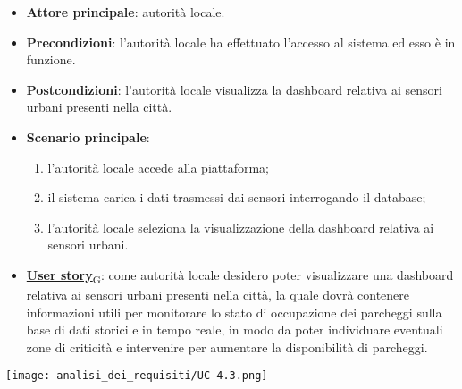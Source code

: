 \begin{itemize}
	\item \textbf{Attore principale}: autorità locale.
	\item \textbf{Precondizioni}: l'autorità locale ha effettuato l'accesso al sistema ed esso è in funzione.
	\item \textbf{Postcondizioni}: l'autorità locale visualizza la dashboard relativa
	      ai sensori urbani presenti nella città.
	\item \textbf{Scenario principale}:
	      \begin{enumerate}
		      \item l'autorità locale accede alla piattaforma;
		      \item il sistema carica i dati trasmessi dai sensori interrogando il database;
		      \item l'autorità locale seleziona la visualizzazione della dashboard relativa ai sensori urbani.
	      \end{enumerate}
	\item \href{https://7last.github.io/docs/pb/documentazione-interna/glossario\#user-story}{\textbf{User story}\textsubscript{G}}:
	      come autorità locale desidero poter visualizzare una dashboard relativa ai sensori urbani presenti nella città, la quale
	      dovrà contenere informazioni utili per monitorare lo stato di occupazione dei parcheggi sulla base di dati storici e in tempo reale,
	      in modo da poter individuare eventuali zone di criticità e intervenire per aumentare la disponibilità di parcheggi.
\end{itemize}
\begin{center}
	\texttt{[image: analisi\_dei\_requisiti/UC-4.3.png]}
\end{center}


